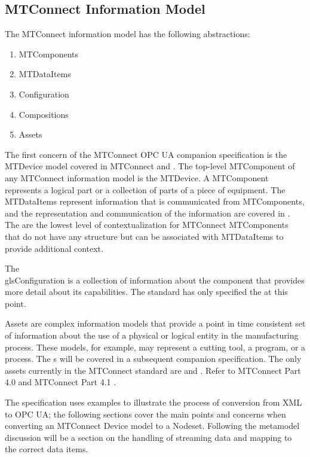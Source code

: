 \FloatBarrier

\subsection{MTConnect Information Model}

The MTConnect information model has the following abstractions:

\begin{enumerate}
  \item \glspl{MTComponent}
  \item \glspl{MTDataItem}
  \item \gls{Configuration}
  \item \glspl{Composition}
  \item \glspl{Asset}
\end{enumerate}

The first concern of the MTConnect OPC UA companion specification is the \gls{MTDevice} model covered in MTConnect \cite{MTCPart2} and \cite{MTCPart3}. The top-level \gls{MTComponent} of any MTConnect information model is the \gls{MTDevice}. A \gls{MTComponent} represents a logical part or a collection of parts of a piece of equipment. The \glspl{MTDataItem} represent information that is communicated from \glspl{MTComponent}, and the representation and communication of the information are covered in \cite{MTCPart3}. The  are the lowest level of contextualization for MTConnect \glspl{MTComponent} that do not have any structure but can be associated with \glspl{MTDataItem} to provide additional context. 

The \\gls{Configuration} is a collection of information about the component that provides more detail about its capabilities. The standard has only specified the  at this point.

\glspl{Asset} are complex information models that provide a point in time consistent set of information about the use of a physical or logical entity in the manufacturing process. These models, for example, may represent a cutting tool, a program, or a process. The s will be covered in a subsequent companion specification. The only assets currently in the MTConnect standard are  and . Refer to MTConnect Part 4.0 \cite{MTCPart40} and MTConnect Part 4.1 \cite{MTCPart41}.

The specification uses examples to illustrate the process of conversion from XML to OPC UA; the following sections cover the main points and concerns when converting an MTConnect Device model to a Nodeset. Following the metamodel discussion will be a section on the handling of streaming data and mapping to the correct data items. 

